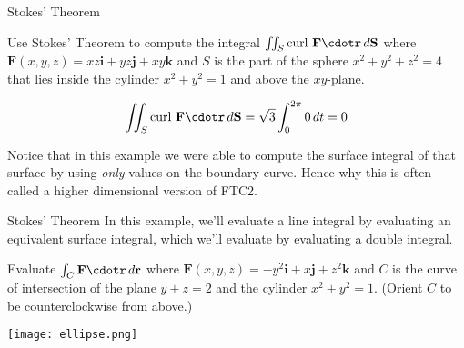 \documentclass[11pt,english,
handout
]{beamer}
\begin{document}
\begin{frame}[t]{Stokes' Theorem}
\small
\begin{example}
Use Stokes' Theorem to compute the integral $\iint_S\text{curl }\mathbf{F}\cdotr\,d\mathbf{S}$ where $\mathbf{F}(x,y,z)=xz\mathbf{i}+yz\mathbf{j}+xy\mathbf{k}$ and $S$ is the part of the sphere $x^2+y^2+z^2=4$ that lies inside the cylinder $x^2+y^2=1$ and above the $xy$-plane.

\[
\iint_S\text{curl }\mathbf{F}\cdotr\,d\mathbf{S}=\sqrt{3}\int_0^{2\pi}0\,dt=0
\]

\lspace
Notice that in this example we were able to compute the surface integral of that surface by using \textit{only} values on the boundary curve. Hence why this is often called a higher dimensional version of FTC2.
\end{example}
\end{frame}








\begin{frame}[t]{Stokes' Theorem}
\small
In this example, we'll evaluate a line integral by evaluating an equivalent surface integral, which we'll evaluate by evaluating a double integral.\pause 
\begin{example}
Evaluate $\int_C\mathbf{F}\cdotr\,d\mathbf{r}$ where $\mathbf{F}(x,y,z)=-y^2\mathbf{i}+x\mathbf{j}+z^2\mathbf{k}$ and $C$ is the curve of intersection of the plane $y+z=2$ and the cylinder $x^2+y^2=1$. (Orient $C$ to be counterclockwise from above.)

\begin{center}
\texttt{[image: ellipse.png]}
\end{center}
\end{example}
\end{frame}
\end{document}
